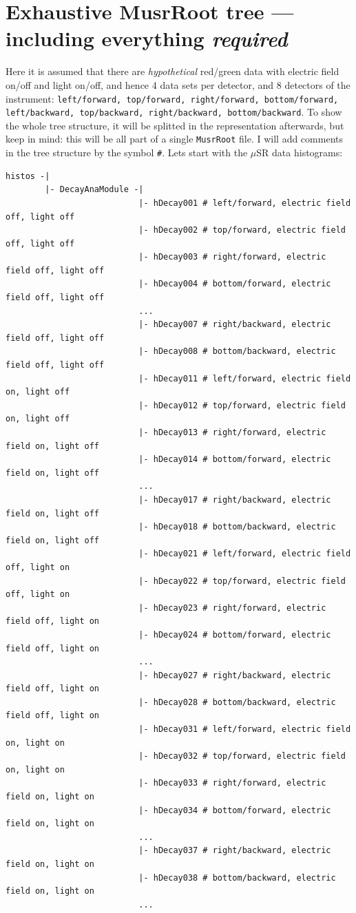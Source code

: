 \documentclass[twoside]{article}
\newcommand{\musr}{$\mu$SR\xspace}
\newcommand{\musrroot}{\texttt{MusrRoot}\xspace}
\newcommand{\redgreen}{\color{red}red\color{black}/\color{green}green\color{black}\xspace}
\begin{document}
\section{Exhaustive MusrRoot tree --- including everything \emph{required}}
Here it is assumed that there are \emph{hypothetical} \redgreen data with electric field on/off and light on/off, and hence 4 data sets per detector, and 8 detectors of the instrument: \texttt{left/forward, top/forward, right/forward, bottom/forward, left/backward, top/backward, right/backward, bottom/backward}. To show the whole tree structure, it will be splitted in the representation afterwards, but keep in mind: this will be all part of a single \musrroot file. I will add comments in the tree structure by the symbol \verb!#!. Lets start with the \musr data histograms:
\begin{small}
\begin{verbatim}
histos -|
        |- DecayAnaModule -|
                           |- hDecay001 # left/forward, electric field off, light off
                           |- hDecay002 # top/forward, electric field off, light off
                           |- hDecay003 # right/forward, electric field off, light off
                           |- hDecay004 # bottom/forward, electric field off, light off
                           ...
                           |- hDecay007 # right/backward, electric field off, light off
                           |- hDecay008 # bottom/backward, electric field off, light off
                           |- hDecay011 # left/forward, electric field on, light off
                           |- hDecay012 # top/forward, electric field on, light off
                           |- hDecay013 # right/forward, electric field on, light off
                           |- hDecay014 # bottom/forward, electric field on, light off
                           ...
                           |- hDecay017 # right/backward, electric field on, light off
                           |- hDecay018 # bottom/backward, electric field on, light off
                           |- hDecay021 # left/forward, electric field off, light on
                           |- hDecay022 # top/forward, electric field off, light on
                           |- hDecay023 # right/forward, electric field off, light on
                           |- hDecay024 # bottom/forward, electric field off, light on
                           ...
                           |- hDecay027 # right/backward, electric field off, light on
                           |- hDecay028 # bottom/backward, electric field off, light on
                           |- hDecay031 # left/forward, electric field on, light on
                           |- hDecay032 # top/forward, electric field on, light on
                           |- hDecay033 # right/forward, electric field on, light on
                           |- hDecay034 # bottom/forward, electric field on, light on
                           ...
                           |- hDecay037 # right/backward, electric field on, light on
                           |- hDecay038 # bottom/backward, electric field on, light on
                           ...
\end{verbatim}
\end{small}
\end{document}
